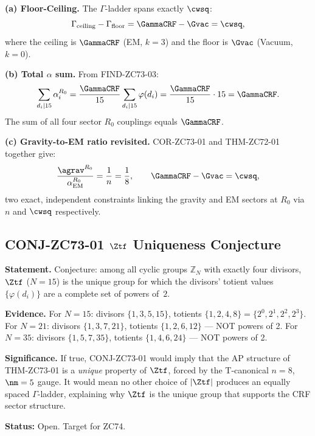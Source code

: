 \documentclass[12pt, a4paper]{article}
\renewcommand{\aEM}{\alpha_{\rm EM}}
\begin{document}
\begin{derivedbox}[title={COR-ZC73-02: Floor, Ceiling,
  and $\alpha$-Sum Identity ($R_0$, Exact)}]
\textbf{(a) Floor-Ceiling.}
The $\Gamma$-ladder spans exactly $\cwsq$:
\[
  \Gamma_{\rm ceiling} - \Gamma_{\rm floor}
  = \GammaCRF - \Gvac = \cwsq,
\]
where the ceiling is $\GammaCRF$ (EM, $k=3$)
and the floor is $\Gvac$ (Vacuum, $k=0$).

\textbf{(b) Total $\alpha$ sum.}
From FIND-ZC73-03:
\[
  \sum_{d_i \mid 15} \alpha_i^{R_0}
  = \frac{\GammaCRF}{15}\sum_{d_i \mid 15}\varphi(d_i)
  = \frac{\GammaCRF}{15} \cdot 15
  = \GammaCRF.
\]
The sum of all four sector $R_0$ couplings equals $\GammaCRF$.

\textbf{(c) Gravity-to-EM ratio revisited.}
COR-ZC73-01 and THM-ZC72-01 together give:
\[
  \frac{\agrav^{R_0}}{\aEM^{R_0}} = \frac{1}{n} = \frac{1}{8},
  \qquad
  \GammaCRF - \Gvac = \cwsq,
\]
two exact, independent constraints linking the gravity and EM
sectors at $R_0$ via $n$ and $\cwsq$ respectively.
\end{derivedbox}

\subsection{CONJ-ZC73-01 \quad $\Ztf$ Uniqueness Conjecture}
\label{sec:conj}

\begin{openqbox}[title={CONJ-ZC73-01: $\Ztf$ Is the Unique
  Group with $\varphi(d_i) = 2^k$ for All Divisors ($R_0$, Open)}]
\textbf{Statement.}
Conjecture: among all cyclic groups $\mathbb{Z}_N$ with exactly
four divisors, $\Ztf$ ($N=15$) is the unique group for which
the divisors' totient values $\{\varphi(d_i)\}$ are a
complete set of powers of~$2$.

\textbf{Evidence.}
For $N=15$: divisors $\{1,3,5,15\}$, totients $\{1,2,4,8\} = \{2^0,2^1,2^2,2^3\}$.
For $N=21$: divisors $\{1,3,7,21\}$, totients $\{1,2,6,12\}$ --- NOT powers of 2.
For $N=35$: divisors $\{1,5,7,35\}$, totients $\{1,4,6,24\}$ --- NOT powers of 2.

\textbf{Significance.}
If true, CONJ-ZC73-01 would imply that the AP structure of
THM-ZC73-01 is a \emph{unique} property of $\Ztf$, forced by
the T-canonical $n=8$, $\nm=5$ gauge.
It would mean no other choice of $|\Ztf|$ produces an equally
spaced $\Gamma$-ladder, explaining why $\Ztf$ is the unique
group that supports the CRF sector structure.

\textbf{Status:} Open. Target for ZC74.
\end{openqbox}
\end{document}
